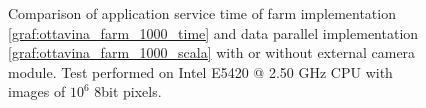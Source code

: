\begin{figure}[p]
\centering
{}
\caption{ Comparison of application service time of farm implementation \ref{graf:ottavina_farm_1000_time} and data parallel implementation  \ref{graf:ottavina_farm_1000_scala} with or without external camera module. Test performed on Intel E5420 @ 2.50 GHz CPU with images of $10^6$ 8bit pixels.}
\label{chart:ottavina_camera}
\end{figure}

